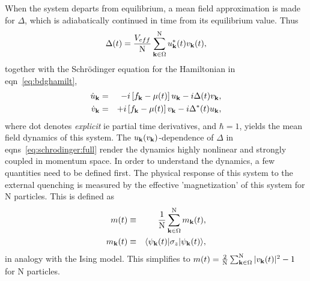 \documentclass[a4paper,10pt]{article}
\begin{document}
When the system departs from equilibrium, a mean field approximation is made for $\Delta$, which is adiabatically continued in time from its equilibrium value. Thus
\begin{equation}
\label{eq:gapmean}
\Delta(t) = \frac{V_{eff}}{\mathrm N}\sum^{\mathrm N}_{{\bf k}\in\Omega} u^{\ast}_{\bf k}(t) v_{\bf k}(t),
\end{equation}
together with the Schr\"odinger equation for the Hamiltonian in eqn~\ref{eq:bdghamilt},
\begin{eqnarray}
\label{eq:schrodinger:full}
\dot{u}_{\bf k} &=& -i\left[f_{\bf k} -\mu(t) \right]{u}_{\bf k} -i \Delta(t) {v}_{\bf k} ,\nonumber \\
\dot{v}_{\bf k} &=& +i\left[f_{\bf k} -\mu(t) \right] {v}_{\bf k}-i\Delta^\ast(t){u}_{\bf k} ,
\end{eqnarray}
where dot denotes \textit{explicit} ie partial time derivatives, and $\hbar=1$, yields the mean field dynamics of this system. The $u_{\bf k}(v_{\bf k})$-dependence of $\Delta$ in eqns~\ref{eq:schrodinger:full} render the dynamics highly nonlinear and strongly coupled in momentum space. In order to understand the dynamics, a few quantities need to be defined first. The physical response of this system to the external quenching is measured by the effective 'magnetization' of this system for $\mathrm{N}$ particles. This is defined as 
\begin{eqnarray}
\label{eq:mag}
m(t) &\equiv& \frac{1}{\mathrm N}\sum^{\mathrm N}_{{\bf k}\in\Omega} m_{\bf k}(t), \nonumber \\
m_{\bf k}(t) &\equiv& \langle \psi_{\bf k}(t)| \sigma_z |\psi_{\bf k}(t)\rangle, 
\end{eqnarray}
in analogy with the Ising model. This simplifies to $ m(t) = \frac{2}{\mathrm N} \sum^{\mathrm N}_{{\bf k}\in\Omega} |v_{\bf k}(t)|^2-1$ for ${\mathrm N}$ particles. 
\end{document}
